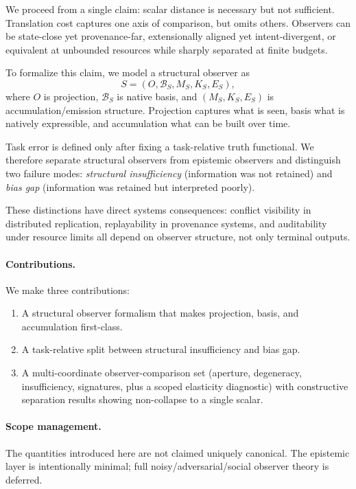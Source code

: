 \documentclass[11pt,twoside]{article}
\theoremstyle{definition}
\begin{document}
We proceed from a single claim: scalar distance is necessary but not sufficient. Translation cost captures one axis of comparison, but omits others. Observers can be state-close yet provenance-far, extensionally aligned yet intent-divergent, or equivalent at unbounded resources while sharply separated at finite budgets.

To formalize this claim, we model a structural observer as
\[
  S=(O,\mathcal{B}_S,M_S,K_S,E_S),
\]
where \(O\) is projection, \(\mathcal{B}_S\) is native basis, and \((M_S,K_S,E_S)\) is accumulation/emission structure. Projection captures what is seen, basis what is natively expressible, and accumulation what can be built over time.

Task error is defined only after fixing a task-relative truth functional. We therefore separate structural observers from epistemic observers and distinguish two failure modes: \emph{structural insufficiency} (information was not retained) and \emph{bias gap} (information was retained but interpreted poorly).

These distinctions have direct systems consequences: conflict visibility in distributed replication, replayability in provenance systems, and auditability under resource limits all depend on observer structure, not only terminal outputs.

\paragraph{Contributions.}
We make three contributions:
\begin{enumerate}[leftmargin=*]
  \item A structural observer formalism that makes projection, basis, and accumulation first-class.
  \item A task-relative split between structural insufficiency and bias gap.
  \item A multi-coordinate observer-comparison set (aperture, degeneracy, insufficiency, signatures, plus a scoped elasticity diagnostic) with constructive separation results showing non-collapse to a single scalar.
\end{enumerate}

\paragraph{Scope management.}
The quantities introduced here are not claimed uniquely canonical. The epistemic layer is intentionally minimal; full noisy/adversarial/social observer theory is deferred.
\end{document}
